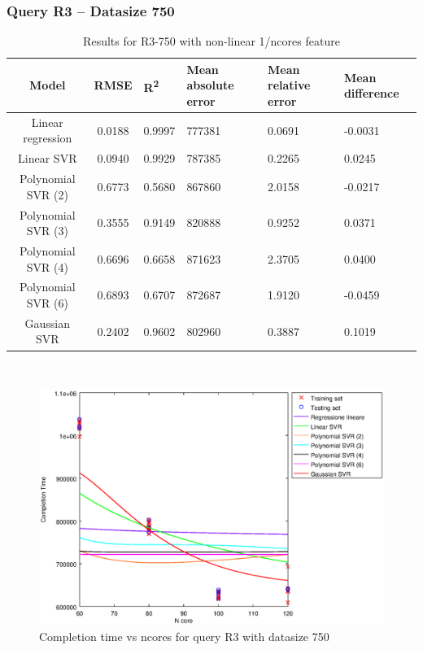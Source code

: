 \documentclass[a4paper,11pt]{article}
\begin{document}
\newpage
\subsubsection{Query R3 -- Datasize 750}
\begin{table}[H]
	\centering
	\begin{adjustbox}{center}
		\begin{tabular}{c | c M{1.2cm} M{2.5cm} M{2.5cm} M{1.8cm}}
			Model & RMSE & R\textsuperscript{2} & Mean absolute error & Mean relative error & Mean difference \tabularnewline
			\hline
			Linear regression & 0.0188 & 0.9997 & 777381 & 0.0691 & -0.0031 \\
			Linear SVR & 0.0940 & 0.9929 & 787385 & 0.2265 & 0.0245 \\
			Polynomial SVR (2) & 0.6773 & 0.5680 & 867860 & 2.0158 & -0.0217 \\
			Polynomial SVR (3) & 0.3555 & 0.9149 & 820888 & 0.9252 & 0.0371 \\
			Polynomial SVR (4) & 0.6696 & 0.6658 & 871623 & 2.3705 & 0.0400 \\
			Polynomial SVR (6) & 0.6893 & 0.6707 & 872687 & 1.9120 & -0.0459 \\
			Gaussian SVR & 0.2402 & 0.9602 & 802960 & 0.3887 & 0.1019 \\
		\end{tabular}
	\end{adjustbox}
	\\
	\caption{Results for R3-750 with non-linear 1/ncores feature}
	\label{table_R3_prediction_all}
\end{table}

\begin {figure}[hbtp]
\centering
\includegraphics[width=\textwidth]{output/R3_750_1_OVER_NCORES/plot_R3_750.eps}
\caption {Completion time vs ncores for query R3 with datasize 750}
\end {figure}
\end{document}
